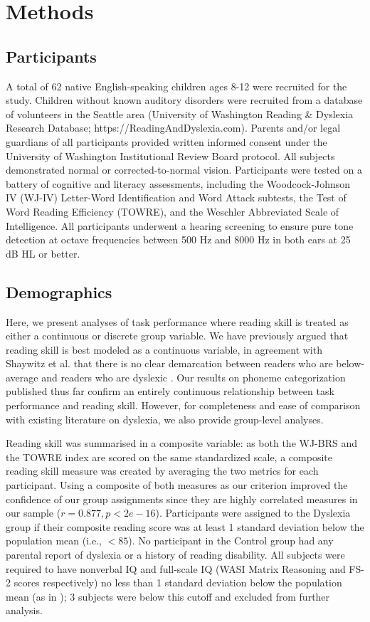 \documentclass[../uwthesis.tex]{subfiles}
\begin{document}
\section{Methods}
\subsection{Participants}
A total of 62 native English-speaking children ages 8-12 were recruited for the study. Children without known auditory disorders were recruited from a database of volunteers in the Seattle area (University of Washington Reading \& Dyslexia Research Database; https://ReadingAndDyslexia.com). Parents and/or legal guardians of all participants provided written informed consent under the University of Washington Institutional Review Board protocol. All subjects demonstrated normal or corrected-to-normal vision. Participants were tested on a battery of cognitive and literacy assessments, including the Woodcock-Johnson IV (WJ-IV) Letter-Word Identification and Word Attack subtests, the Test of Word Reading Efficiency (TOWRE), and the Weschler Abbreviated Scale of Intelligence. All participants underwent a hearing screening to ensure pure tone detection at octave frequencies between 500 Hz and 8000 Hz in both ears at 25 dB HL or better.


\subsection{Demographics}

Here, we present analyses of task performance where reading skill is treated as either a continuous or discrete group variable. We have previously argued that reading skill is best modeled as a continuous variable, in agreement with Shaywitz et al. that there is no clear demarcation between readers who are below-average and readers who are dyslexic \citep{Shaywitz1992EvidenceAbility}. Our results on phoneme categorization published thus far \citep{OBrien2018,OBrien2019CategoricalDuration}confirm an entirely continuous relationship between task performance and reading skill. However, for completeness and ease of comparison with existing literature on dyslexia, we also provide group-level analyses.  

Reading skill was summarised in a composite variable: as both the WJ-BRS and the TOWRE index are scored on the same standardized scale, a composite reading skill measure was created by averaging the two metrics for each participant. Using a composite of both measures as our criterion improved the confidence of our group assignments since they are highly correlated measures in our sample ($r=0.877, p<2e-16$). Participants were assigned to the Dyslexia group if their composite reading score was at least 1 standard deviation below the population mean (i.e., $<85$). No participant in the Control group had any parental report of dyslexia or a history of reading disability. All subjects were required to have nonverbal IQ and full-scale IQ (WASI Matrix Reasoning and FS-2 scores respectively) no less than 1 standard deviation below the population mean (as in \citep{OBrien2018,OBrien2019CategoricalDuration}); 3 subjects were below this cutoff and excluded from further analysis. 
\end{document}
